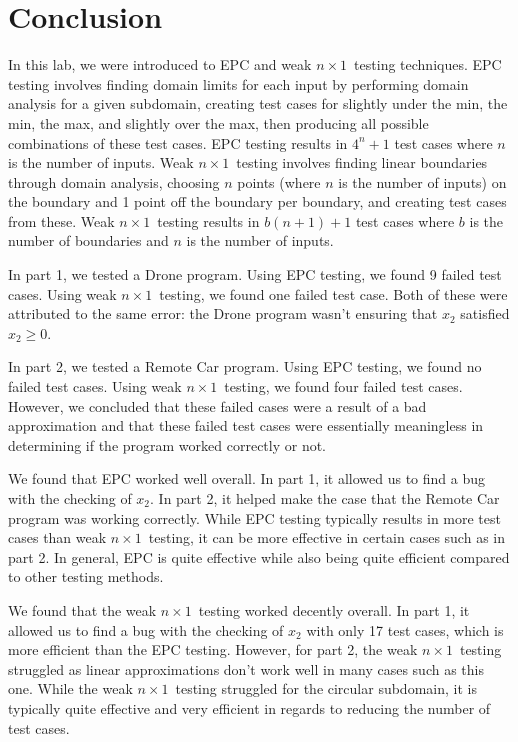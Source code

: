 \documentclass[12pt, letterpaper, titlepage]{article}
\newcommand{\nx}{$n\times1$}
\begin{document}
\section{Conclusion}
In this lab, we were introduced to EPC and weak \nx\ testing techniques. EPC testing involves finding domain limits for each input by performing domain analysis for a given subdomain, creating test cases for slightly under the min, the min, the max, and slightly over the max, then producing all possible combinations of these test cases. EPC testing results in $4^n+1$ test cases where $n$ is the number of inputs. Weak \nx\ testing involves finding linear boundaries through domain analysis, choosing $n$ points (where $n$ is the number of inputs) on the boundary and 1 point off the boundary per boundary, and creating test cases from these. Weak \nx\ testing results in $b(n+1)+1$ test cases where $b$ is the number of boundaries and $n$ is the number of inputs.

In part 1, we tested a Drone program. Using EPC testing, we found 9 failed test cases. Using weak \nx\ testing, we found one failed test case. Both of these were attributed to the same error: the Drone program wasn't ensuring that $x_2$ satisfied $x_2\geq0$.

In part 2, we tested a Remote Car program. Using EPC testing, we found no failed test cases. Using weak \nx\ testing, we found four failed test cases. However, we concluded that these failed cases were a result of a bad approximation and that these failed test cases were essentially meaningless in determining if the program worked correctly or not. 

We found that EPC worked well overall. In part 1, it allowed us to find a bug with the checking of $x_2$. In part 2, it helped make the case that the Remote Car program was working correctly. While EPC testing typically results in more test cases than weak \nx\ testing, it can be more effective in certain cases such as in part 2. In general, EPC is quite effective while also being quite efficient compared to other testing methods.

We found that the weak \nx\ testing worked decently overall. In part 1, it allowed us to find a bug with the checking of $x_2$ with only 17 test cases, which is more efficient than the EPC testing. However, for part 2, the weak \nx\ testing struggled as linear approximations don't work well in many cases such as this one. While the weak \nx\ testing struggled for the circular subdomain, it is typically quite effective and very efficient in regards to reducing the number of test cases.
\end{document}
